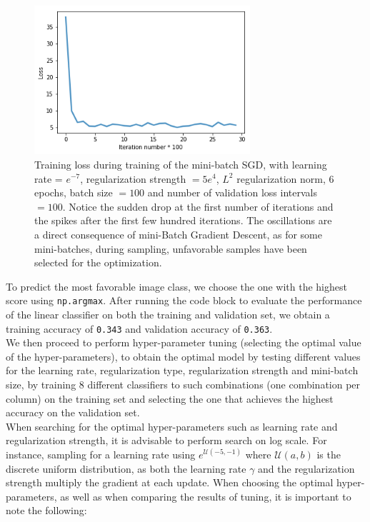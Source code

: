 \documentclass{article}
\def\code#1{\texttt{#1}}
\begin{document}
     \begin{figure}[t]
    	\centering
    	\includegraphics[width=8cm]{images/loss.png}
    	\caption{Training loss during training of the mini-batch SGD, with learning rate = $e^{-7}$, regularization strength $= 5 e^4$, $L^2$ regularization norm, 6 epochs, batch size $= 100$ and number of validation loss intervals $= 100$. Notice the sudden drop at the first number of iterations and the spikes after the first few hundred iterations. The oscillations are a direct consequence of mini-Batch Gradient Descent, as for some mini-batches, during sampling, unfavorable samples have been selected for the optimization.}
    \end{figure}
    
    To predict the most favorable image class, we choose the one with the highest score using \code{np.argmax}. After running the code block to evaluate the performance of the linear classifier on both the training and validation set, we obtain a training accuracy of \code{0.343} and validation accuracy of \code{0.363}. \\
    
    We then proceed to perform hyper-parameter tuning (selecting the optimal value of the hyper-parameters), to obtain the optimal model by testing different values for the learning rate, regularization type, regularization strength and mini-batch size, by training 8 different classifiers to such combinations (one combination per column) on the training set and selecting the one that achieves the highest accuracy on the validation set. \\

    When searching for the optimal hyper-parameters such as learning rate and regularization strength, it is advisable to perform search on log scale. For instance, sampling for a learning rate using $\displaystyle e^{\mathcal{U}(-5,-1)}$ where $\mathcal{U}(a,b)$ is the discrete uniform distribution, as both the learning rate $\gamma$ and the regularization strength multiply the gradient at each update. When choosing the optimal hyper-parameters, as well as when comparing the results of tuning, it is important to note the following: \\
    
\end{document}
